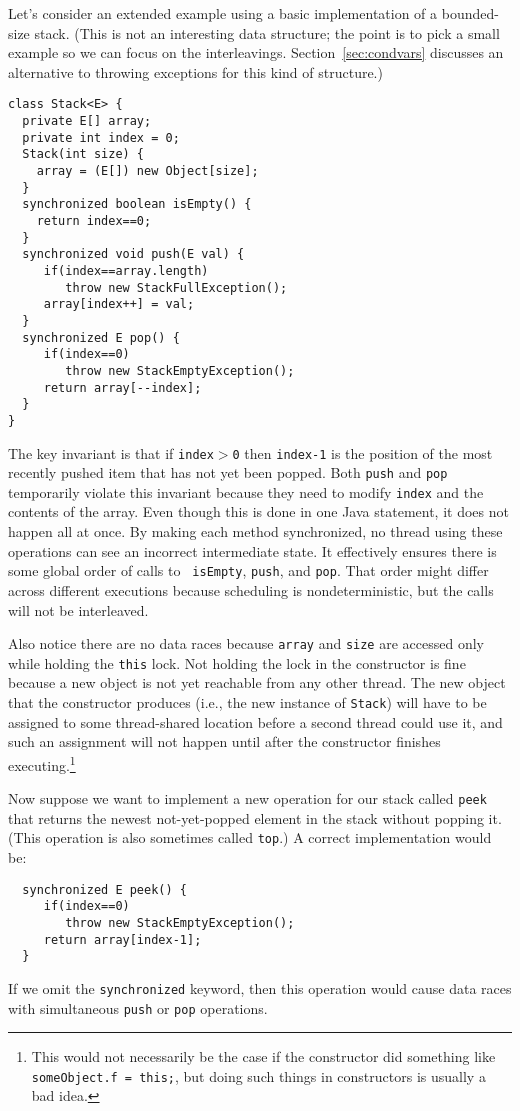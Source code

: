 \documentclass[10pt]{article}
\begin{document}
Let's consider an extended example using a basic implementation of a
bounded-size stack.  (This is not an interesting data structure; the
point is to pick a small example so we can focus on the interleavings.
Section~\ref{sec:condvars} discusses an alternative to throwing
exceptions for this kind of structure.)
\begin{verbatim}
class Stack<E> {
  private E[] array;
  private int index = 0;
  Stack(int size) {
    array = (E[]) new Object[size];
  }
  synchronized boolean isEmpty() { 
    return index==0; 
  }
  synchronized void push(E val) {
     if(index==array.length)
        throw new StackFullException();
     array[index++] = val;
  }
  synchronized E pop() { 
     if(index==0)
        throw new StackEmptyException();
     return array[--index];
  }
}
\end{verbatim}
The key invariant is that if {\tt index$>$0} then {\tt index-1} is the
position of the most recently pushed item that has not yet been
popped.  Both {\tt push} and {\tt pop} temporarily violate this
invariant because they need to modify {\tt index} and the contents of
the array.  Even though this is done in one Java statement, it does
not happen all at once.  By making each method synchronized, no thread
using these operations can see an incorrect intermediate state.  It
effectively ensures there is some global order of calls to {\tt
  isEmpty}, {\tt push}, and {\tt pop}.  That order might differ across
different executions because scheduling is nondeterministic, but the
calls will not be interleaved.

Also notice there are no data races because {\tt array} and {\tt size}
are accessed only while holding the {\tt this} lock.  Not holding the
lock in the constructor is fine because a new object is not yet
reachable from any other thread.  The new object that the constructor
produces (i.e., the new instance of {\tt Stack}) will
have to be assigned to some thread-shared location before a second
thread could use it, and such an assignment will not happen until
after the constructor finishes executing.\footnote{This would not
  necessarily be the case if the constructor did something like 
  {\tt someObject.f = this;}, but doing such things in constructors is
  usually a bad idea.}

Now suppose we want to implement a new operation for our stack called
{\tt peek} that returns the newest
not-yet-popped element in the stack without popping it.  (This
operation is also sometimes called {\tt top}.) A correct
implementation would be:
\begin{verbatim}
  synchronized E peek() {
     if(index==0)
        throw new StackEmptyException();
     return array[index-1];
  }
\end{verbatim}
If we omit the {\tt synchronized} keyword, then this operation would
cause data races with simultaneous {\tt push} or {\tt pop} operations.
\end{document}

